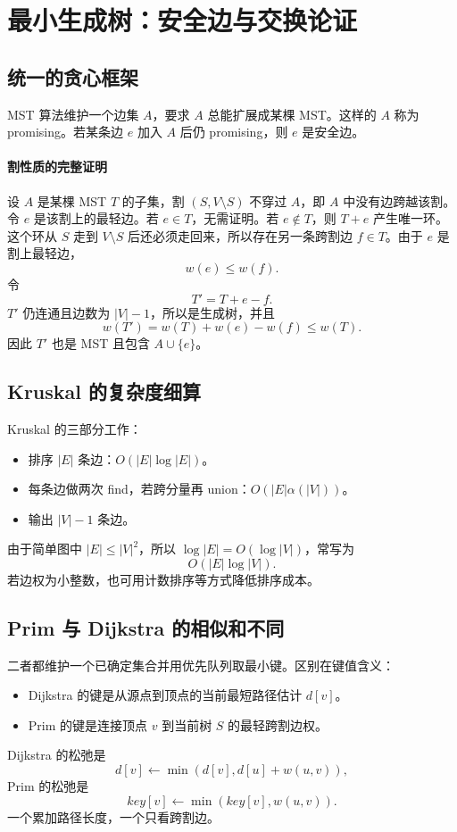 \documentclass[UTF8,openany,12pt]{ctexbook}
\theoremstyle{remark}
\begin{document}
\section{最小生成树：安全边与交换论证}
\subsection{统一的贪心框架}
MST 算法维护一个边集 $A$，要求 $A$ 总能扩展成某棵 MST。这样的 $A$ 称为 promising。若某条边 $e$ 加入 $A$ 后仍 promising，则 $e$ 是安全边。

\paragraph{割性质的完整证明}
设 $A$ 是某棵 MST $T$ 的子集，割 $(S,V\setminus S)$ 不穿过 $A$，即 $A$ 中没有边跨越该割。令 $e$ 是该割上的最轻边。若 $e\in T$，无需证明。若 $e\notin T$，则 $T+e$ 产生唯一环。这个环从 $S$ 走到 $V\setminus S$ 后还必须走回来，所以存在另一条跨割边 $f\in T$。由于 $e$ 是割上最轻边，
\[
w(e)\le w(f).
\]
令
\[
T'=T+e-f.
\]
$T'$ 仍连通且边数为 $|V|-1$，所以是生成树，并且
\[
w(T')=w(T)+w(e)-w(f)\le w(T).
\]
因此 $T'$ 也是 MST 且包含 $A\cup\{e\}$。

\subsection{Kruskal 的复杂度细算}
Kruskal 的三部分工作：
\begin{itemize}
  \item 排序 $|E|$ 条边：$O(|E|\log |E|)$。
  \item 每条边做两次 find，若跨分量再 union：$O(|E|\alpha(|V|))$。
  \item 输出 $|V|-1$ 条边。
\end{itemize}
由于简单图中 $|E|\le |V|^2$，所以 $\log |E|=O(\log |V|)$，常写为
\[
O(|E|\log |V|).
\]
若边权为小整数，也可用计数排序等方式降低排序成本。

\subsection{Prim 与 Dijkstra 的相似和不同}
二者都维护一个已确定集合并用优先队列取最小键。区别在键值含义：
\begin{itemize}
  \item Dijkstra 的键是从源点到顶点的当前最短路径估计 $d[v]$。
  \item Prim 的键是连接顶点 $v$ 到当前树 $S$ 的最轻跨割边权。
\end{itemize}
Dijkstra 的松弛是
\[
d[v]\gets \min(d[v],d[u]+w(u,v)),
\]
Prim 的松弛是
\[
key[v]\gets \min(key[v],w(u,v)).
\]
一个累加路径长度，一个只看跨割边。
\end{document}

